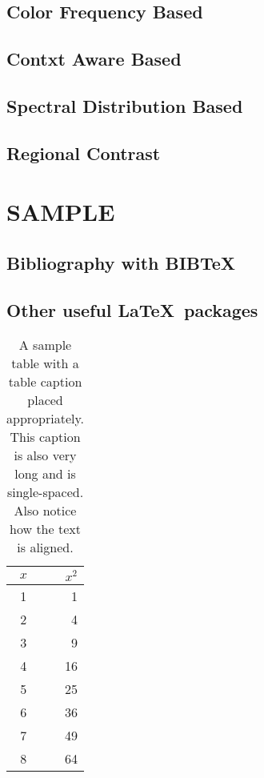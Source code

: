\documentclass[MTech]{iitmdiss}
\begin{document}
\section{Color Frequency Based}


\section{Contxt Aware Based}
\section{Spectral Distribution Based}
\section{Regional Contrast}




\chapter{SAMPLE} 
 \section{Bibliography with BIB\TeX} 
 \section{Other useful \LaTeX\ packages}

 
 \begin{table}[htbp]
   \caption{A sample table with a table caption placed
     appropriately. This caption is also very long and is
     single-spaced.  Also notice how the text is aligned.}
   \begin{center}
   \begin{tabular}[c]{|c|r|} \hline
     $x$ & $x^2$ \\ \hline
     1  &  1   \\
     2  &  4  \\
     3  &  9  \\
     4  &  16  \\
     5  &  25  \\
     6  &  36  \\
     7  &  49  \\
     8  &  64  \\ \hline
   \end{tabular}
   \label{tab:sample}
   \end{center}
 \end{table}
\end{document}
